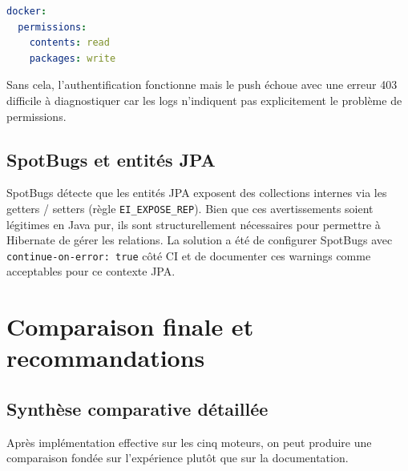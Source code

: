 \documentclass[12pt,a4paper]{report}
\begin{document}
\begin{lstlisting}[language=YAML]
docker:
  permissions:
    contents: read
    packages: write
\end{lstlisting}

Sans cela, l'authentification fonctionne mais le push échoue avec une erreur
403 difficile à diagnostiquer car les logs n'indiquent pas explicitement le
problème de permissions.

\section{SpotBugs et entités JPA}

SpotBugs détecte que les entités JPA exposent des collections internes via les
getters / setters (règle \texttt{EI\_EXPOSE\_REP}). Bien que ces avertissements
soient légitimes en Java pur, ils sont structurellement nécessaires pour
permettre à Hibernate de gérer les relations. La solution a été de configurer
SpotBugs avec \texttt{continue-on-error: true} côté CI et de documenter ces
warnings comme acceptables pour ce contexte JPA.

\chapter{Comparaison finale et recommandations}
\label{ch:reco}

\section{Synthèse comparative détaillée}

Après implémentation effective sur les cinq moteurs, on peut produire une
comparaison fondée sur l'expérience plutôt que sur la documentation.
\end{document}
